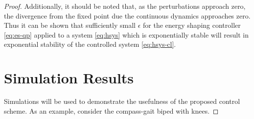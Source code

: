 \begin{proof}
Additionally, it should be noted that, as the perturbations approach zero, the divergence from the fixed point due the continuous dynamics approaches zero.
%
Thus it can be shown that sufficiently small $\epsilon$ for the energy shaping controller \eqref{eq:es-qp} applied to a system \eqref{eq:hsys} which is exponentially stable will result in exponential stability of the controlled system \eqref{eq:hsys-cl}.

\section{Simulation Results}
Simulations will be used to demonstrate the usefulness of the proposed control scheme.
%
As an example, consider the compass-gait biped with knees.

\end{proof}
